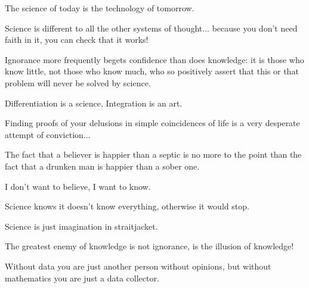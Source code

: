  	 \begin{fquote}The science of today is the technology of tomorrow.
 	\end{fquote}
 	
 	 \begin{fquote}Science is different to all the other systems of thought... because you don't need faith in it, you can check that it works!
 	\end{fquote}
 	
 	\begin{fquote}Ignorance more frequently begets confidence than does knowledge: it is those who know little, not those who know much, who so positively assert that this or that problem will never be solved by science.
 	\end{fquote}
 	
 	\begin{fquote}Differentiation is a science, Integration is an art.
 	\end{fquote}
 	
 	\begin{fquote}Finding proofs of your delusions in simple coincidences of life is a very desperate attempt of conviction...
 	\end{fquote}
 	
 	\begin{fquote}The fact that a believer is happier than a septic is no more to the point than the fact that a drunken man is happier than a sober one.
 	\end{fquote}
 	
 	\begin{fquote}I don't want to believe, I want to know.
 	\end{fquote}
 	
 	\begin{fquote}Science knows it doesn't know everything, otherwise it would stop.
 	\end{fquote}
 	
 	 \begin{fquote}Science is just imagination in straitjacket.
 	\end{fquote}
 	
 	 \begin{fquote}The greatest enemy of knowledge is not ignorance, is the illusion of knowledge!
 	\end{fquote}
 	
 	 \begin{fquote}Without data you are just another person without opinions, but without mathematics you are just a data collector.
 	\end{fquote}
 	
